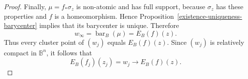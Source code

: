\documentclass[10pt,a4paper]{amsart}
\newcommand{\B}{\mathbb B}
\newcommand{\barB}{\operatorname{bar}_{B}}
\theoremstyle{plain}
\theoremstyle{definition}
\theoremstyle{remark}
\theoremstyle{definition}
\begin{document}
\begin{proof}
Finally, \(\mu=f_*\sigma_z\) is non-atomic and has full support, because
\(\sigma_z\) has these properties and \(f\) is a homeomorphism. Hence
Proposition~\ref{existence-uniqueness-barycenter} implies that its
barycenter is unique. Therefore
\[
        w_\infty=\barB(\mu)=E_B(f)(z).
\]
Thus every cluster point of \((w_j)\) equals \(E_B(f)(z)\). Since
\((w_j)\) is relatively compact in \(\B^n\), it follows that
\[
        E_B(f_j)(z_j)=w_j\longrightarrow E_B(f)(z).
\]
\end{proof}
\end{document}
